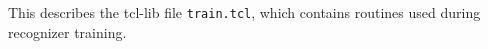 
\section{}

This describes the tcl-lib  file \texttt{train.tcl}, which contains
routines used during recognizer training.

\subsection{}

\subsection{}

\subsection{}

